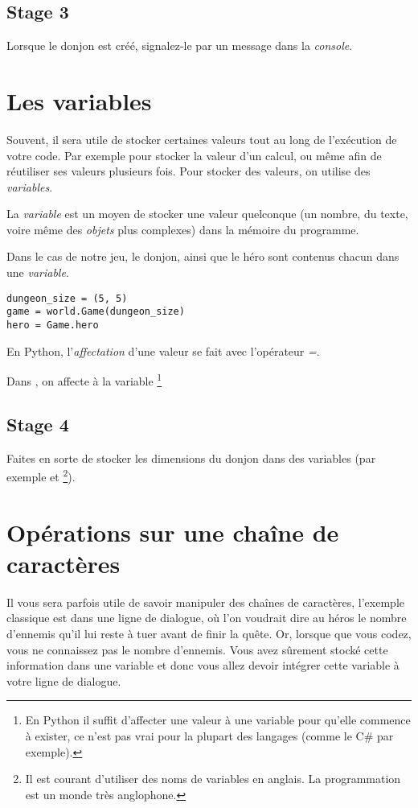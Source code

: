 \subsection{Stage 3}
Lorsque le donjon est créé, signalez-le par un message dans la \emph{console}.

\section{Les variables}

Souvent, il sera utile de stocker certaines valeurs tout au long de l’exécution de votre code.
Par exemple pour stocker la valeur d’un calcul, ou même afin de réutiliser ses valeurs plusieurs fois. Pour stocker des valeurs, on utilise des \emph{variables}.

La \emph{variable} est un moyen de stocker une valeur quelconque (un nombre, du texte, voire même des \emph{objets} plus complexes) dans la mémoire du programme.

Dans le cas de notre jeu, le donjon, ainsi que le héro sont contenus chacun dans une \emph{variable}.

\begin{lstlisting}
dungeon_size = (5, 5)
game = world.Game(dungeon_size)
hero = Game.hero
\end{lstlisting}

En Python, l’\emph{affectation} d’une valeur se fait avec l’opérateur \emph{=}.

Dans , on affecte  à la variable \footnote{ En Python il suffit d’affecter une valeur à une variable pour qu’elle commence à exister, ce n’est pas vrai pour la plupart des langages (comme le C\# par exemple).}

\subsection{Stage 4}
Faites en sorte de stocker les dimensions du donjon dans des variables (par exemple  et \footnote{Il est courant d'utiliser des noms de variables en anglais. La programmation est un monde très anglophone.}).

\section{Opérations sur une chaîne de caractères}

Il vous sera parfois utile de savoir manipuler des chaînes de caractères, l'exemple classique est dans une ligne de dialogue, où l'on voudrait dire au héros le nombre d'ennemis qu'il lui reste à tuer avant de finir la quête. Or, lorsque que vous codez, vous ne connaissez pas le nombre d'ennemis. Vous avez sûrement stocké cette information dans une variable et donc vous allez devoir intégrer cette variable à votre ligne de dialogue.

